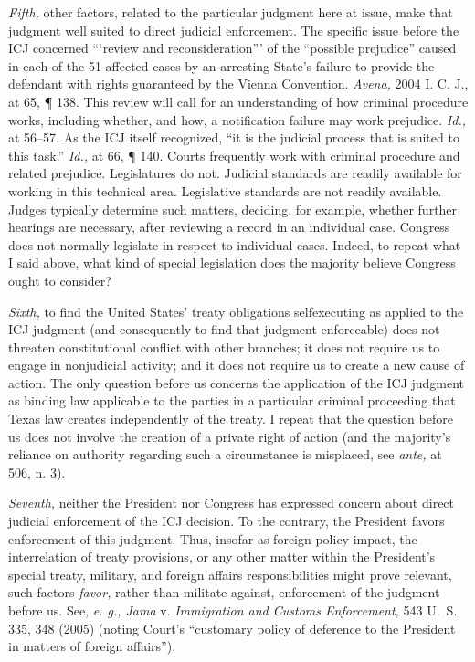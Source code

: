   \emph{Fifth,} other factors, related to the particular judgment here
at issue, make that judgment well suited to direct judi\newpage cial
enforcement. The specific issue before the ICJ concerned ``‘review
and reconsideration''' of the ``possible prejudice'' caused in
each of the 51 affected cases by an arresting State's failure to
provide the defendant with rights guaranteed by the Vienna Convention.
\emph{Avena,} 2004 I. C. J., at 65, ¶ 138. This review will call for
an understanding of how criminal procedure works, including whether, and
how, a notification failure may work prejudice. \emph{Id.,} at 56--57.
As the ICJ itself recognized, ``it is the judicial process that is
suited to this task.'' \emph{Id.,} at 66, ¶ 140. Courts frequently
work with criminal procedure and related prejudice. Legislatures do not.
Judicial standards are readily available for working in this technical
area. Legislative standards are not readily available. Judges typically
determine such matters, deciding, for example, whether further hearings
are necessary, after reviewing a record in an individual case. Congress
does not normally legislate in respect to individual cases. Indeed, to
repeat what I said above, what kind of special legislation does the
majority believe Congress ought to consider?

  \emph{Sixth,} to find the United States' treaty obligations
selfexecuting as applied to the ICJ judgment (and consequently to find
that judgment enforceable) does not threaten constitutional conflict
with other branches; it does not require us to engage in nonjudicial
activity; and it does not require us to create a new cause of action.
The only question before us concerns the application of the ICJ judgment
as binding law applicable to the parties in a particular criminal
proceeding that Texas law creates independently of the treaty. I repeat
that the question before us does not involve the creation of a private
right of action (and the majority's reliance on authority regarding
such a circumstance is misplaced, see \emph{ante,} at 506, n. 3).

  \emph{Seventh,} neither the President nor Congress has expressed
concern about direct judicial enforcement of the ICJ decision. To the
contrary, the President favors enforcement of this \newpage  judgment.
Thus, insofar as foreign policy impact, the interrelation of treaty
provisions, or any other matter within the President's special treaty,
military, and foreign affairs responsibilities might prove relevant,
such factors \emph{favor,} rather than militate against, enforcement of
the judgment before us. See, \emph{e. g., Jama} v. \emph{Immigration and
Customs Enforcement,} 543 U.~S. 335, 348 (2005) (noting Court's
``customary policy of deference to the President in matters of foreign
affairs'').

